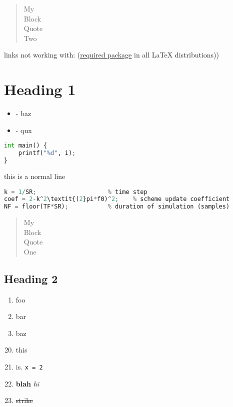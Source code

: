 \documentclass{article}
\begin{document}
 
\setcounter{secnumdepth}{0}

\begin{quote}
    My\\
    Block\\
    Quote\\
    Two
\end{quote}

links not working with: (\href{https://ctan.org/pkg/required}{required package} in all LaTeX distributions))
\section{Heading 1}

\begin{itemize}
    \item - baz
    \item - qux
\end{itemize}

\begin{lstlisting}[language=python, style=myStyle]
int main() {
    printf("%d", i);
}
\end{lstlisting}

this is a normal line
\begin{lstlisting}[language=python, style=myStyle]
% derived parameters
k = 1/SR;                    % time step
coef = 2-k^2\textit{(2}pi*f0)^2;    % scheme update coefficient
NF = floor(TF*SR);           % duration of simulation (samples)
\end{lstlisting}

\begin{quote}
    My\\
    Block\\
    Quote\\
    One
\end{quote}

\subsection{Heading 2}

\begin{enumerate}
    \setcounter{enumi}{0}
    \item foo
    \item bar
    \item baz
\end{enumerate}

\begin{enumerate}
    \setcounter{enumi}{19}
    \item this
    \item is. \verb|x = 2|
    \item \textbf{blah} \textit{hi}
    \item \sout{strike}
\end{enumerate}
\end{document}
